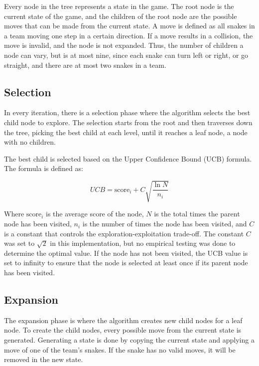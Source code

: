 \documentclass[a4paper,12pt]{article}
\begin{document}
Every node in the tree represents a state in the game. The root node is the current state of the game, and the children of the root node are the possible moves that can be made from the current state. A move is defined as all snakes in a team moving one step in a certain direction. If a move results in a collision, the move is invalid, and the node is not expanded. Thus, the number of children a node can vary, but is at most nine, since each snake can turn left or right, or go straight, and there are at most two snakes in a team. %


\subsection{Selection}
In every iteration, there is a selection phase where the algorithm selects the best child node to explore. The selection starts from the root and then traverses down the tree, picking the best child at each level, until it reaches a leaf node, a node with no children.


The best child is selected based on the Upper Confidence Bound (UCB) formula. The formula is defined as:

\begin{equation} \label{eq:ucb}
    UCB = \text{score}_i + C \sqrt{\frac{\ln{N}}{n_i}}
\end{equation}

Where $\text{score}_i$ is the average score of the node, $N$ is the total times the parent node has been visited, $n_i$ is the number of times the node has been visited, and $C$ is a constant that controls the exploration-exploitation trade-off. The constant $C$ was set to $\sqrt{2}$ in this implementation, but no empirical testing was done to determine the optimal value. If the node has not been visited, the UCB value is set to infinity to ensure that the node is selected at least once if its parent node has been visited.


\subsection{Expansion}

The expansion phase is where the algorithm creates new child nodes for a leaf node. To create the child nodes, every possible move from the current state is generated. Generating a state is done by copying the current state and applying a move of one of the team's snakes. If the snake has no valid moves, it will be removed in the new state. 
\end{document}
